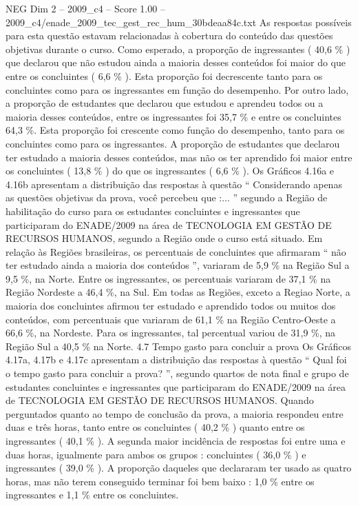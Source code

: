 \begin{textsample}{NEG Dim 2 – 2009\_c4 – Score 1.00 – 2009\_c4/enade\_2009\_tec\_gest\_rec\_hum\_30bdeaa84c.txt}
As respostas possíveis para esta questão estavam relacionadas à cobertura do conteúdo das questões objetivas durante o curso.
Como esperado, a proporção de ingressantes ( 40,6 \% ) que declarou que não estudou ainda a maioria desses conteúdos foi maior do que entre os concluintes ( 6,6 \% ).
Esta proporção foi decrescente tanto para os concluintes como para os ingressantes em função do desempenho.
Por outro lado, a proporção de estudantes que declarou que estudou e aprendeu todos ou a maioria desses conteúdos, entre os ingressantes foi 35,7 \% e entre os concluintes 64,3 \%.
Esta proporção foi crescente como função do desempenho, tanto para os concluintes como para os ingressantes.
A proporção de estudantes que declarou ter estudado a maioria desses conteúdos, mas não os ter aprendido foi maior entre os concluintes ( 13,8 \% ) do que os ingressantes ( 6,6 \% ).
Os Gráficos 4.16a e 4.16b apresentam a distribuição das respostas à questão “ Considerando apenas as questões objetivas da prova, você percebeu que :... ” segundo a Região de habilitação do curso para os estudantes concluintes e ingressantes que participaram do ENADE/2009 na área de TECNOLOGIA EM GESTÃO DE RECURSOS HUMANOS, segundo a Região onde o curso está situado.
Em relação às Regiões brasileiras, os percentuais de concluintes que afirmaram “ não ter estudado ainda a maioria dos conteúdos ”, variaram de 5,9 \% na Região Sul a 9,5 \%, na Norte.
Entre os ingressantes, os percentuais variaram de 37,1 \% na Região Nordeste a 46,4 \%, na Sul.
Em todas as Regiões, exceto a Regiao Norte, a maioria dos concluintes afirmou ter estudado e aprendido todos ou muitos dos conteúdos, com percentuais que variaram de 61,1 \% na Região Centro-Oeste a 66,6 \%, na Nordeste.
Para os ingressantes, tal percentual variou de 31,9 \%, na Região Sul a 40,5 \% na Norte. 4.7 Tempo gasto para concluir a prova Os Gráficos 4.17a, 4.17b e 4.17c apresentam a distribuição das respostas à questão “ Qual foi o tempo gasto para concluir a prova? ”, segundo quartos de nota final e grupo de estudantes concluintes e ingressantes que participaram do ENADE/2009 na área de TECNOLOGIA EM GESTÃO DE RECURSOS HUMANOS.
Quando perguntados quanto ao tempo de conclusão da prova, a maioria respondeu entre duas e três horas, tanto entre os concluintes ( 40,2 \% ) quanto entre os ingressantes ( 40,1 \% ).
A segunda maior incidência de respostas foi entre uma e duas horas, igualmente para ambos os grupos : concluintes ( 36,0 \% ) e ingressantes ( 39,0 \% ).
A proporção daqueles que declararam ter usado as quatro horas, mas não terem conseguido terminar foi bem baixo : 1,0 \% entre os ingressantes e 1,1 \% entre os concluintes.

\end{textsample}
